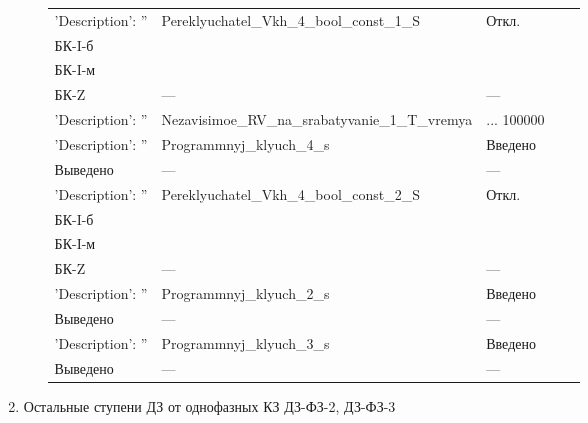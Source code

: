 \begin{enumerate}[label=\arabic{section}.\arabic{subsection}.\arabic{enumi}, labelsep=4pt, leftmargin=0pt, itemindent=57pt, itemsep=0pt, parsep=5pt]
\begin{enumerate}[label=\arabic{section}.\arabic{subsection}.\arabic{enumi}.\arabic*, labelsep=4pt, leftmargin=0em, itemindent=65pt, parsep=0pt]
\begin{longtable}{|>{\centering\arraybackslash}m{5.3cm}|>{\centering\arraybackslash}m{3.3cm}|>{\centering\arraybackslash}m{4.2cm}|>{\centering\arraybackslash}m{1.8cm}|>{\centering\arraybackslash}m{1cm}|}
\hline
\raggedright {'Description': ''} & \centering Pereklyuchatel_Vkh_4_bool_const_1_S & \centering Откл. \\ БК-I-б \\ БК-I-м \\ БК-Z & \centering --- & \centering \arraybackslash --- \\
\hline
\raggedright {'Description': ''} & \centering Nezavisimoe_RV_na_srabatyvanie_1_T_vremya & \centering 0 ... 100000 & \centering  & \centering \arraybackslash 1 \\
\hline
\raggedright {'Description': ''} & \centering Programmnyj_klyuch_4_s & \centering Введено \\ Выведено & \centering --- & \centering \arraybackslash --- \\
\hline
\raggedright {'Description': ''} & \centering Pereklyuchatel_Vkh_4_bool_const_2_S & \centering Откл. \\ БК-I-б \\ БК-I-м \\ БК-Z & \centering --- & \centering \arraybackslash --- \\
\hline
\raggedright {'Description': ''} & \centering Programmnyj_klyuch_2_s & \centering Введено \\ Выведено & \centering --- & \centering \arraybackslash --- \\
\hline
\raggedright {'Description': ''} & \centering Programmnyj_klyuch_3_s & \centering Введено \\ Выведено & \centering --- & \centering \arraybackslash --- \\
\hline
\end{longtable}
\normalsize

\end{enumerate}


\item\label{sec:secfz} Остальные ступени ДЗ от однофазных КЗ ДЗ-ФЗ-2, ДЗ-ФЗ-3
\begin{enumerate}[label=\arabic{section}.\arabic{subsection}.\arabic{enumi}.\arabic*, labelsep=4pt, leftmargin=0em, itemindent=65pt, parsep=0pt]


\end{enumerate}
\end{enumerate}
